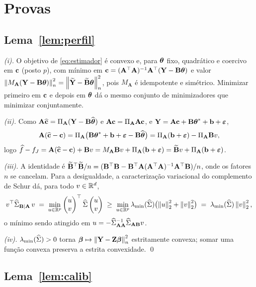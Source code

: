 \documentclass[11pt,a4paper]{article}
\newcommand{\lmin}{\lambda_{\min}}
\newcommand{\Amat}{\mathbf{A}}
\newcommand{\Bmat}{\mathbf{B}}
\newcommand{\Btil}{\widetilde{\Bmat}}
\newcommand{\PA}{\Pi_{\Amat}}
\newcommand{\MA}{M_{\Amat}}
\newcommand{\bbeta}{\boldsymbol{\beta}}
\newcommand{\bveps}{\boldsymbol{\varepsilon}}
\newcommand{\bb}{\mathbf{b}}
\newcommand{\bY}{\mathbf{Y}}
\newcommand{\GBA}{\Gramhat_{\Bmat\mid\Amat}}
\begin{document}
\section{Provas}

\subsection*{Lema~\ref{lem:perfil}}

\emph{(i).} O objetivo de \eqref{eq:estimador} é convexo e, para $\boldsymbol{\theta}$
fixo, quadrático e coercivo em $\mathbf{c}$ (posto $p$), com mínimo em
$\bc = (\Amat\T\Amat)^{-1}\Amat\T(\bY - \Bmat\btheta)$ e valor
$\normn{\MA(\bY - \Bmat\btheta)}^{2} = \normn{\widetilde{\bY} -
\Btil\btheta}^{2}$, pois $\MA$ é idempotente e simétrico. Minimizar primeiro em
$\mathbf{c}$ e depois em $\boldsymbol{\theta}$ dá o mesmo conjunto de minimizadores que minimizar
conjuntamente.

\emph{(ii).} Como $\Amat\chat = \PA(\bY - \Bmat\thetahat)$ e
$\Amat\bc = \PA\Amat\bc$, e $\bY = \Amat\bc + \Bmat\thetastar + \bb + \bveps$,
\[
  \Amat(\chat - \bc) = \PA\bigl(\Bmat\thetastar + \bb + \bveps
  - \Bmat\thetahat\bigr) = \PA(\bb + \bveps) - \PA\Bmat v ,
\]
logo $\widehat{f} - f_{J} = \Amat(\chat-\bc) + \Bmat v = \MA\Bmat v +
\PA(\bb+\bveps) = \Btil v + \PA(\bb+\bveps)$.

\emph{(iii).} A identidade é
$\Btil\T\Btil/n = (\Bmat\T\Bmat - \Bmat\T\Amat(\Amat\T\Amat)^{-1}\Amat\T\Bmat)/n$,
onde os fatores $n$ se cancelam. Para a desigualdade, a caracterização
variacional do complemento de Schur dá, para todo $v \in \mathbb{R}^{d}$,
\[
  v\T\GBA\,v
  \;=\; \min_{u\in\R^{p}} \begin{pmatrix}u\\v\end{pmatrix}\T \Gramhat
  \begin{pmatrix}u\\v\end{pmatrix}
  \;\ge\; \min_{u\in\R^{p}} \lmin(\Gramhat)\bigl(\norm{u}_{2}^{2} + \norm{v}_{2}^{2}\bigr)
  \;=\; \lmin(\Gramhat)\norm{v}_{2}^{2},
\]
o mínimo sendo atingido em $u = -\Gramhat_{\Amat\Amat}^{-1}\Gramhat_{\Amat\Bmat}v$.

\emph{(iv).} $\lmin(\Gramhat) > 0$ torna
$\bbeta \mapsto \normn{\bY - \bZ\bbeta}^{2}$ estritamente convexa; somar uma
função convexa preserva a estrita convexidade. \qed

\subsection*{Lema~\ref{lem:calib}}
\end{document}
